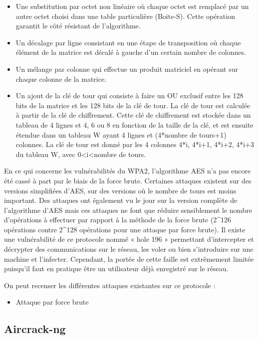 \documentclass[11pt]{article}
\begin{document}
\begin{itemize}
\item 	Une substitution par octet non linéaire où chaque octet est remplacé par un autre octet choisi dans une table particulière (Boite-S). Cette opération garantit le côté résistant de l’algorithme.
\item 	Un décalage par ligne consistant en une étape de transposition où chaque élément de la matrice est décalé à gauche d’un certain nombre de colonnes.
\item 	Un mélange par colonne qui effectue un produit matriciel en opérant sur chaque colonne de la matrice.
\item  Un ajout de la clé de tour qui consiste à faire un OU exclusif entre les 128 bits de la matrice et les 128 bits de la clé de tour. La clé de tour est calculée à partir de la clé de chiffrement. Cette clé de chiffrement est stockée dans un tableau de 4 lignes et 4, 6 ou 8 en fonction de la taille de la clé, et est ensuite étendue dans un tableau W ayant 4 lignes et (4*nombre de tours+1) colonnes. La clé de tour est donné par les 4 colonnes 4*i, 4*i+1, 4*i+2, 4*i+3 du tableau W, avec 0<i<nombre de tours.
\end{itemize}

En ce qui concerne les vulnérabilités du WPA2, l’algorithme AES n’a pas encore été cassé à part par le biais de la force brute.
Certaines attaques existent sur des versions simplifiées d’AES, sur des versions où le nombre de tours est moins important.
Des attaques ont également vu le jour sur la version complète de l’algorithme d’AES mais ces attaques ne font que réduire sensiblement le nombre d’opérations à effectuer par rapport à la méthode de la force brute (2^126 opérations contre 2^128 opérations pour une attaque par force brute).
Il existe une vulnérabilité de ce protocole nommé « hole 196 » permettant d’intercepter et décrypter des communications sur le réseau, les voler ou bien s’introduire sur une machine et l’infecter. Cependant, la portée de cette faille est extrêmement limitée puisqu’il faut en pratique être un utilisateur déjà enregistré sur le réseau.

On peut recenser les différentes attaques existantes sur ce protocole :

\begin{itemize}
\item 	Attaque par force brute
\end{itemize}


\subsection{Aircrack-ng}
\newpage
\end{document}
